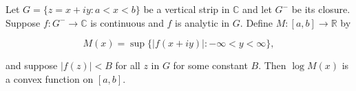 Let $G = \{z = x+iy: a < x < b\}$ be a vertical strip in $\mathbb{C}$ and let $G^-$ be its closure. Suppose $f: G^- \to \mathbb{C}$ is continuous and $f$ is analytic in $G$. Define $M: [a, b] \to \mathbb{R}$ by

$$M(x) = \sup \{ |f(x+iy)| : -\infty < y < \infty \},$$

and suppose $|f(z)| < B$ for all $z$ in $G$ for some constant $B$. Then $\log M(x)$ is a convex function on $[a, b]$.
